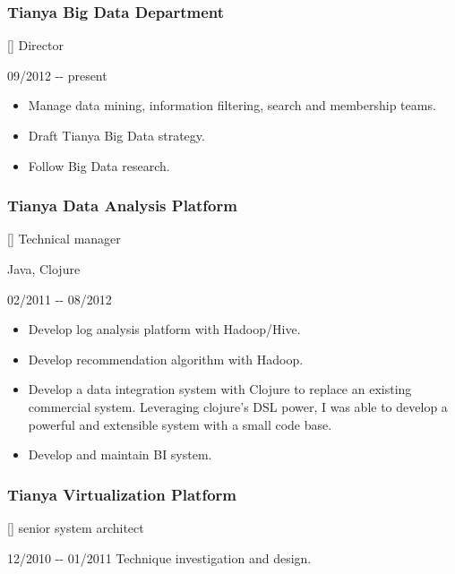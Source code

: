 \documentclass[a4paper]{article}
\newenvironment{DUlineblock}[1]{%
    \list{}{\setlength{\partopsep}{\parskip}
            \addtolength{\partopsep}{\baselineskip}
            \setlength{\topsep}{0pt}
            \setlength{\itemsep}{0.15\baselineskip}
            \setlength{\parsep}{0pt}
            \setlength{\leftmargin}{#1}}
    \raggedright
  }
  {\endlist}
\begin{document}
\begin{CJK}{UTF8}{gkai}
\subsubsection*{Tianya Big Data Department}
\begin{DUlineblock}{0em}
\item[] Director
\item[] 09/2012 -{}- present
\end{DUlineblock}
\begin{itemize}
\item Manage data mining, information filtering, search and membership teams.
\item Draft Tianya Big Data strategy.
\item Follow Big Data research.
\end{itemize}

\subsubsection*{Tianya Data Analysis Platform}
\begin{DUlineblock}{0em}
\item[] Technical manager
\item[] Java, Clojure
\item[] 02/2011 -{}- 08/2012
\end{DUlineblock}
\begin{itemize}
\item Develop log analysis platform with Hadoop/Hive.
\item Develop recommendation algorithm with Hadoop.
\item Develop a data integration system with Clojure to replace an existing
commercial system. Leveraging clojure's DSL power, I was able to develop a
powerful and extensible system with a small code base.
\item Develop and maintain BI system.
\end{itemize}

\subsubsection*{Tianya Virtualization Platform}
\begin{DUlineblock}{0em}
\item[] senior system architect
\item[] 12/2010 -{}- 01/2011
\end{DUlineblock}
Technique investigation and design.


\end{CJK}
\end{document}
